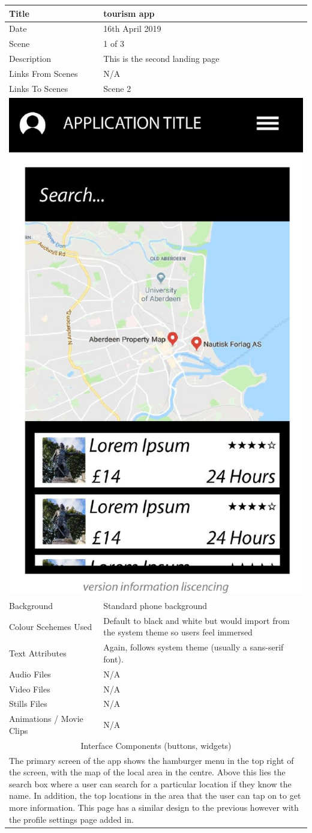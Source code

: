 \hspace{-1cm}
	\begin{tabular}{p{4cm}p{10cm}}
		\hline
		Title & tourism app \\
		\hline
		Date & 16th April 2019 \\
		\hline
		Scene & 1 of 3 \\
		\hline
		Description & This is the second landing page \\
		\hline
		Links From Scenes & N/A \\
		\hline
		Links To Scenes & Scene 2 \\
		\hline
		\multicolumn{2}{c}{\includegraphics[width=0.5\linewidth]{images/screen0-1.jpg}} \\
		\hline
		Background & Standard phone background \\
		\hline
		Colour Scehemes Used & Default to black and white but would import from the system theme so users feel immersed \\
		\hline
		Text Attributes & Again, follows system theme (usually a sans-serif font). \\
		\hline
		Audio Files & N/A \\
		\hline
		Video Files & N/A \\
		\hline
		Stills Files & N/A \\
		\hline
		Animations / Movie Clips & N/A \\
		\hline
		\multicolumn{2}{c}{Interface Components (buttons, widgets)} \\
		\hline
		\multicolumn{2}{p{14cm}}{The primary screen of the app shows the hamburger menu in the top right of the screen, with the map of the local area in the centre. Above this lies the search box where a user can search for a particular location if they know the name. In addition, the top locations in the area that the user can tap on to get more information. This page has a similar design to the previous however with the profile settings page added in. } \\
		\hline
	\end{tabular}
